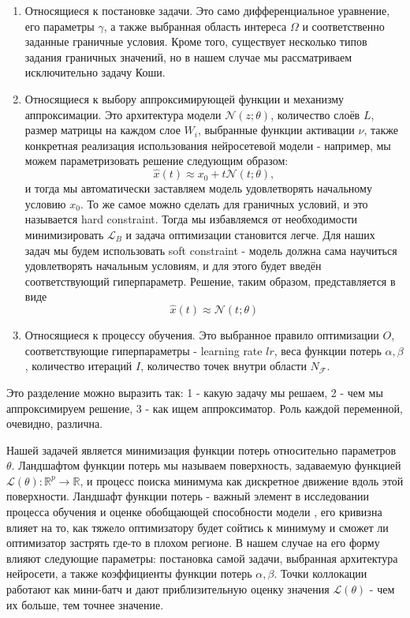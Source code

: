 \documentclass[a4paper, 12pt]{article}
\begin{document}
\begin{enumerate}
    \item Относящиеся к постановке задачи. Это само дифференциальное уравнение, его параметры $\gamma$, а также выбранная область интереса $\Omega$ и соответственно заданные граничные условия. Кроме того, существует несколько типов задания граничных значений, но в нашем случае мы рассматриваем исключительно задачу Коши.
    \item Относящиеся к выбору аппроксимирующей функции и механизму аппроксимации. Это архитектура модели $\mathcal{N}(z; \theta)$, количество слоёв $L$, размер матрицы на каждом слое $W_i$, выбранные функции активации $\nu$, также конкретная реализация использования нейросетевой модели - например, мы можем параметризовать решение следующим образом:
    $$
    \hat{x}(t) \approx x_0 + t \mathcal{N}(t; \theta),
    $$
    и тогда мы автоматически заставляем модель удовлетворять начальному условию $x_0$. То же самое можно сделать для граничных условий, и это называется hard constraint. Тогда мы избавляемся от необходимости минимизировать $\mathcal{L}_B$ и задача оптимизации становится легче. Для наших задач мы будем использовать soft constraint - модель должна сама научиться удовлетворять начальным условиям, и для этого будет введён соответствующий гиперпараметр. Решение, таким образом, представляется в виде
    $$
    \hat{x}(t) \approx \mathcal{N}(t; \theta)
    $$
    \item Относящиеся к процессу обучения. Это выбранное правило оптимизации $O$, соответствующие гиперпараметры - learning rate $lr$, веса функции потерь $\alpha, \beta$, количество итераций $I$, количество точек внутри области $N_\mathcal{F}$.
\end{enumerate}

Это разделение можно выразить так: 1 - какую задачу мы решаем, 2 - чем мы аппроксимируем решение, 3 - как ищем аппроксиматор. Роль каждой переменной, очевидно, различна.

Нашей задачей является минимизация функции потерь относительно параметров $\theta$. Ландшафтом функции потерь мы называем поверхность, задаваемую функцией $\mathcal{L}(\theta) : \mathbb{R}^p \to \mathbb{R}$, и процесс поиска минимума как дискретное движение вдоль этой поверхности. Ландшафт функции потерь - важный элемент в исследовании процесса обучения и оценке обобщающей способности модели \cite{li2018visualizing}, его кривизна влияет на то, как тяжело оптимизатору будет сойтись к минимуму и сможет ли оптимизатор застрять где-то в плохом регионе. В нашем случае на его форму влияют следующие параметры: постановка самой задачи, выбранная архитектура нейросети, а также коэффициенты функции потерь $\alpha, \beta$. Точки коллокации работают как мини-батч и дают приблизительную оценку значения $\mathcal{L}(\theta)$ - чем их больше, тем точнее значение.
\end{document}
